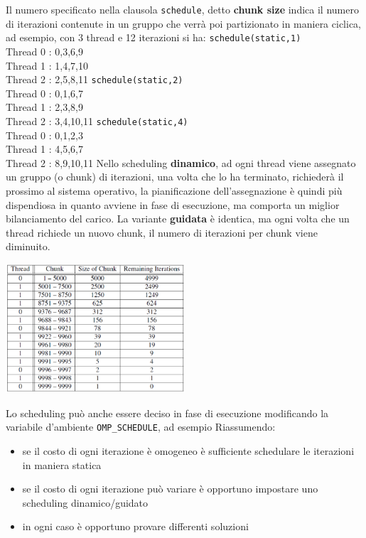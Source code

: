\documentclass[10pt, letterpaper]{report}
\begin{document}
Il numero specificato nella clausola \texttt{schedule}, detto \textbf{chunk size} indica il numero di iterazioni contenute in un gruppo che verrà poi partizionato in maniera ciclica, ad esempio, con 3 thread e 12 iterazioni si ha:\acc
    \texttt{schedule(static,1)}\\ 
    \indent\indent Thread 0 : 0,3,6,9\\
    \indent\indent Thread 1 : 1,4,7,10\\
    \indent\indent Thread 2 : 2,5,8,11\acc
    \texttt{schedule(static,2)}\\ 
    \indent\indent Thread 0 : 0,1,6,7\\
    \indent\indent Thread 1 : 2,3,8,9\\
    \indent\indent Thread 2 : 3,4,10,11\acc
    \texttt{schedule(static,4)}\\ 
    \indent\indent Thread 0 : 0,1,2,3\\
    \indent\indent Thread 1 : 4,5,6,7\\
    \indent\indent Thread 2 : 8,9,10,11\acc
Nello scheduling \textbf{dinamico}, ad ogni thread viene assegnato un gruppo (o chunk) di iterazioni, una volta che lo ha terminato, richiederà il prossimo al sistema operativo, la pianificazione dell'assegnazione è quindi più dispendiosa in quanto avviene in fase di esecuzione, ma comporta un miglior bilanciamento del carico. La variante \textbf{guidata} è identica, ma ogni volta che un thread richiede un nuovo chunk, il numero di iterazioni per chunk viene diminuito.
\begin{center}
    \includegraphics[width=0.5\textwidth ]{images/guidedSchedule.png}
\end{center}
Lo scheduling può anche essere deciso in fase di esecuzione modificando la variabile d'ambiente \texttt{OMP\_SCHEDULE}, ad esempio\acc 
{}
\acc Riassumendo:\begin{itemize}
    \item se il costo di ogni iterazione è omogeneo è sufficiente schedulare le iterazioni in maniera statica 
    \item se il costo di ogni iterazione può variare è opportuno impostare uno scheduling dinamico/guidato 
    \item in ogni caso è opportuno provare differenti soluzioni
\end{itemize}
\end{document}
